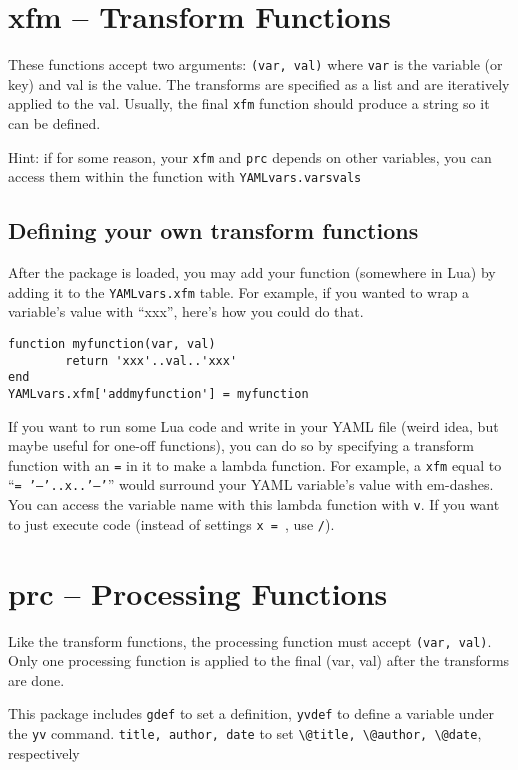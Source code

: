 \documentclass[11pt,parskip=half]{scrartcl}
\begin{document}
 \section{xfm -- Transform Functions}
These functions accept two arguments: \texttt{(var, val)} where \texttt{var} is the variable (or key) and val is the value.
The transforms are specified as a list and are iteratively applied to the val.
Usually, the final \texttt{xfm} function should produce a string so it can be defined.

Hint: if for some reason, your \texttt{xfm} and \texttt{prc} depends on other variables,
you can access them within the function
with \texttt{YAMLvars.varsvals}

\subsection{Defining your own transform functions}
After the package is loaded, you may add your function (somewhere in Lua)
by adding it to the \texttt{YAMLvars.xfm} table.
For example, if you wanted to wrap a variable's value with ``xxx'', here's how you could do that.
\begin{verbatim}
function myfunction(var, val)
        return 'xxx'..val..'xxx'
end
YAMLvars.xfm['addmyfunction'] = myfunction
\end{verbatim}

If you want to run some Lua code and write in your YAML file (weird idea, but maybe useful for one-off functions),
you can do so by specifying a transform function with an \texttt{=} in it to make a lambda function.
For example, a \texttt{xfm} equal to
``\texttt{= '---'..x..'---'}''
would surround your YAML variable's value with em-dashes.
You can access the variable name with this lambda function with \texttt{v}.
If you want to just execute code (instead of settings \texttt{x = }, use \texttt{/}).

  \section{prc -- Processing Functions}
Like the transform functions, the processing function must accept \texttt{(var, val)}.
Only one processing function is applied to the final (var, val) after the transforms are done.

This package includes \texttt{gdef} to set a definition, \texttt{yvdef} to define a variable under the \texttt{yv} command.
\texttt{title, author, date} to set \texttt{\textbackslash @title, \textbackslash @author, \textbackslash @date},
respectively
\end{document}
